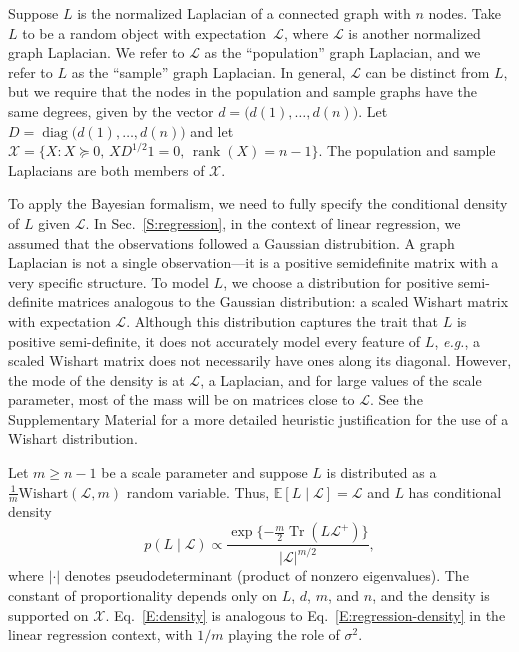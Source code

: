 \documentclass[12pt]{article}
\DeclareMathOperator*{\Tr}{Tr}
\DeclareMathOperator*{\diag}{diag}
\DeclareMathOperator*{\rank}{rank}
\newcommand{\E}{\mathbb{E}}
\theoremstyle{plain}
\begin{document}
Suppose $L$ is the normalized Laplacian of a connected graph with $n$
nodes.  Take $L$ to be a random object with expectation~$\mathcal{L}$,
where $\mathcal{L}$ is another normalized graph Laplacian.  We refer to $\mathcal{L}$ as the
``population'' graph Laplacian, and we refer to $L$ as the ``sample''
graph Laplacian.  
In general, $\mathcal{L}$ can be distinct from $L$,
but we require that the nodes in the population and sample graphs have
the same degrees, given by the vector $d = \big(d(1), \dotsc,
d(n)\big)$. Let $D = \diag\big(d(1), \dotsc, d(n)\big)$ and let
$\mathcal{X} = \{ X : X \succeq 0, \, X D^{1/2} 1 = 0, \, \rank(X) = n - 1 \}$.  The
population and sample Laplacians are both members of $\mathcal{X}$.


To apply the Bayesian formalism, we need to fully specify the conditional 
density of $L$ given $\mathcal{L}$.  
In Sec.~\ref{S:regression}, in the context of linear regression, we assumed 
that the observations followed a Gaussian distrubition.  
A graph Laplacian is not a single observation---it is a positive
semidefinite matrix with a very specific structure.  To model $L$, we
choose a distribution for positive semi-definite matrices analogous to
the Gaussian distribution: a scaled Wishart matrix with expectation
$\mathcal{L}$.  
Although this distribution captures the trait that $L$ is positive 
semi-definite, it does not accurately model every feature of $L$, 
\emph{e.g.}, a scaled Wishart matrix does not necessarily have ones along 
its diagonal.  
However, the mode of the density is at $\mathcal{L}$, a Laplacian, and for 
large values of the scale parameter, most of the mass will be on matrices 
close to $\mathcal{L}$.
See the Supplementary Material for a more detailed heuristic justification
for the use of a Wishart distribution.

Let $m \geq n - 1$ be a scale parameter
and suppose $L$ is distributed as a
$\tfrac{1}{m} \mathrm{Wishart}(\mathcal{L}, m)$ random variable.
Thus, $\E[L \mid \mathcal{L}] = \mathcal{L}$ and $L$ has conditional density
\begin{equation}\label{E:density}
  p(L \mid \mathcal{L})
    \propto
      \frac{\exp\{ -\frac{m}{2} \Tr(L \mathcal{L}^+)\}}
           {|\mathcal{L}|^{m/2}},
\end{equation}
where $|\cdot|$ denotes pseudodeterminant (product of nonzero
eigenvalues).  The constant of proportionality depends only on $L$,
$d$, $m$, and $n$, and the density is supported on $\mathcal{X}$.
Eq.~\eqref{E:density} is analogous to Eq.~\eqref{E:regression-density}
in the linear regression context, with $1/m$ playing the role of
$\sigma^2$.
\end{document}
